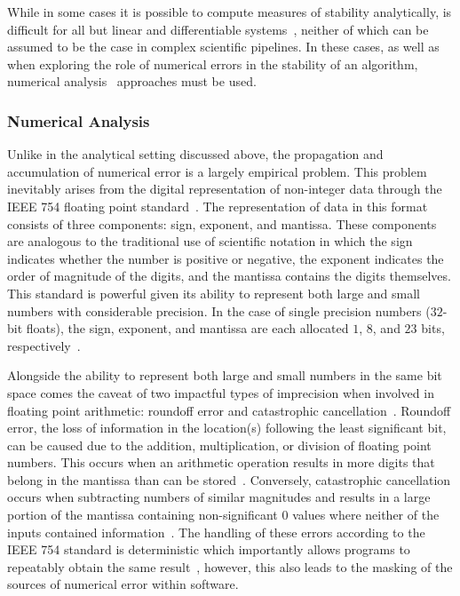 While in some cases it is possible to compute measures of stability analytically, is difficult for all but linear and
differentiable systems~\cite{kiusalaas2013numerical}, neither of which can be assumed to be the case in complex
scientific pipelines. In these cases, as well as when exploring the role of numerical errors in the stability of an
algorithm, numerical analysis~\cite{hildebrand1987introduction} approaches must be used.

\subsubsection{Numerical Analysis}
Unlike in the analytical setting discussed above, the propagation and accumulation of numerical error is a largely
empirical problem. This problem inevitably arises from the digital representation of non-integer data through the
IEEE 754 floating point standard~\cite{ieee754}. The representation of data in this format consists of three
components: sign, exponent, and mantissa. These components are analogous to the traditional use of scientific notation
in which the sign indicates whether the number is positive or negative, the exponent indicates the order of magnitude
of the digits, and the mantissa contains the digits themselves. This standard is powerful given its ability to
represent both large and small numbers with considerable precision. In the case of single precision numbers ($32$-bit
floats), the sign, exponent, and mantissa are each allocated $1$, $8$, and $23$ bits, respectively~\cite{ieee754}.

Alongside the ability to represent both large and small numbers in the same bit space comes the caveat of two impactful
types of imprecision when involved in floating point arithmetic: roundoff error and catastrophic
cancellation~\cite{muller2018handbook}. Roundoff error, the loss of information in the location(s) following the least
significant bit, can be caused due to the addition, multiplication, or division of floating point numbers. This occurs
when an arithmetic operation results in more digits that belong in the mantissa than can be
stored~\cite{muller2018handbook}. Conversely, catastrophic cancellation occurs when subtracting numbers of similar
magnitudes and results in a large portion of the mantissa containing non-significant $0$ values where neither of the
inputs contained information~\cite{muller2018handbook}. The handling of these errors according to the IEEE 754 standard
is deterministic which importantly allows programs to repeatably obtain the same result~\cite{ieee754}, however, this
also leads to the masking of the sources of numerical error within software.

